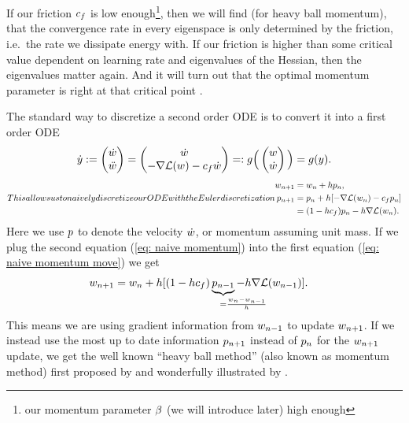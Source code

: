 If our friction \(c_f\) is low enough\footnote{
	our momentum parameter \(\beta\) (we will introduce later) high enough
}, then we will find (for heavy ball momentum), that the convergence rate in
every eigenspace is only determined by the friction, i.e.\ the rate we dissipate
energy with. If our friction is higher than some
critical value dependent on learning rate and eigenvalues of the Hessian, then
the eigenvalues matter again. And it will turn out that the optimal momentum
parameter is right at that critical point \parencite[see also ``critical
dampening'', e.g.][]{gohWhyMomentumReally2017}.

The standard way to discretize a second order ODE is to convert it into a first
order ODE
%
\begin{align*}
	\dot{y} := \begin{pmatrix}
		\dot{w}\\
		\ddot{w}
	\end{pmatrix}
	= \begin{pmatrix}
		\dot{w} \\
		-\nabla \mathcal{L}(w) - c_f \dot{w}
	\end{pmatrix}
	=: g\Big(\begin{pmatrix}
		w \\
		\dot{w}
	\end{pmatrix}\Big)
	= g(y).
\end{align*}
%
\begin{subequations}
This allows us to naively discretize our ODE with the Euler discretization
\begin{align}
	\weights_{n+1} &= \weights_n + \lr \momentum_n, \label{eq: naive momentum move}\\
	\momentum_{n+1} &= \momentum_n + \lr [-\nabla \Loss(\weights_n) - \friction \momentum_n]
	\label{eq: naive momentum}\\ \nonumber
	&= (1-\lr\friction)\momentum_n - \lr\nabla \Loss(\weights_n).
\end{align}
\end{subequations}
%
Here we use \(p\) to denote the velocity \(\dot{w}\), or momentum
assuming unit mass.
If we plug the second equation (\ref{eq: naive momentum}) into the first
equation (\ref{eq: naive momentum move}) we get
%
\begin{align*}
	\weights_{n+1}
	&= \weights_n + \lr [(1-\lr\friction)
	\underbrace{\momentum_{n-1}}_{=\mathrlap{\frac{\weights_n-\weights_{n-1}}{\lr}}}
	- \lr\nabla \Loss(\weights_{n-1})].
\end{align*}
%
This means we are using gradient information from \(w_{n-1}\) to update
\(w_{n+1}\). If we instead use the most up to date information
\(p_{n+1}\) instead of \(p_n\) for the \(w_{n+1}\) update,
we get the well known ``heavy ball method'' (also known as momentum method) first proposed
by \textcite{polyakMethodsSpeedingConvergence1964} and wonderfully illustrated
by \textcite{gohWhyMomentumReally2017}.

